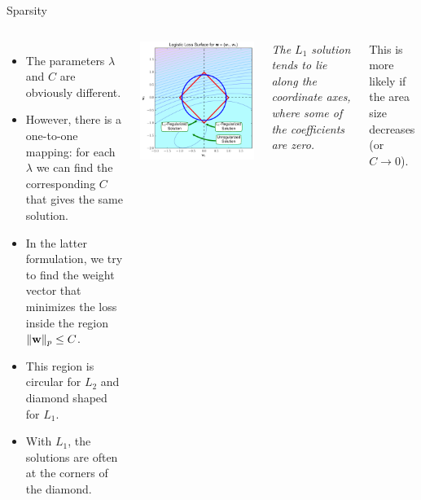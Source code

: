 \documentclass[10pt, aspectratio=169]{beamer} %
\newcommand{\w}{{\bf w}}
\begin{document}
\begin{frame}{Sparsity}
\begin{columns}
\begin{itemize}
\item The parameters $\lambda$ and $C$ are obviously different. 
\item However, there is a one-to-one
mapping: for each $\lambda$ we can find the corresponding $C$ that gives the same solution.
\item In the latter formulation, we try to find the weight vector that 
minimizes the loss inside the region $\|\w\|_p \le C$.
\item This region is circular for $L_2$ and diamond shaped for $L_1$.
\item With $L_1$, the solutions are often at the corners of the diamond.
\end{itemize}
\centerline{\includegraphics[width=\textwidth]{L1-reg.pdf}}

\vspace*{0.2cm}
{\small \em The $L_1$ solution tends to lie along the coordinate axes, where some of the coefficients are zero.

\vspace*{0.2cm}
This is more likely if the area size decreases (or $C\rightarrow 0$).\par}

\end{columns}
\end{frame}
\end{document}
